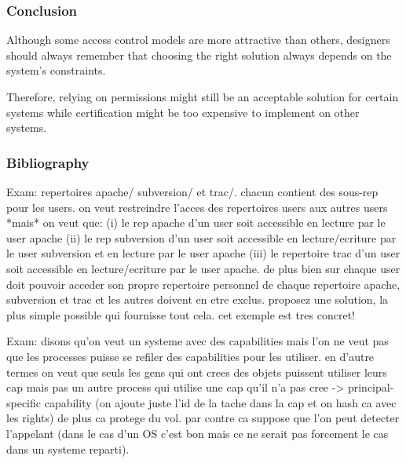 
\begin{frame}
  \frametitle{Conclusion}

  Although some access control models are more attractive than others,
  designers should always remember that choosing the right solution always
  depends on the system's constraints.

  \-

  Therefore, relying on  permissions might still be an acceptable
  solution for certain systems while certification might be too expensive
  to implement on other systems.
\end{frame}

%
%

\begin{frame}
  \frametitle{Bibliography}

  
  
\end{frame}



Exam: repertoires apache/ subversion/ et trac/. chacun contient des sous-rep
  pour les users. on veut restreindre l'acces des repertoires users aux autres
  users *mais* on veut que: (i) le rep apache d'un user soit accessible
  en lecture par le user apache (ii) le rep subversion d'un user soit
  accessible en lecture/ecriture par le user subversion et en lecture par
  le user apache (iii) le repertoire trac d'un user soit accessible en
  lecture/ecriture par le user apache.
  de plus bien sur chaque user doit pouvoir acceder son propre repertoire
  personnel de chaque repertoire apache, subversion et trac et les autres
  doivent en etre exclus.
  proposez une solution, la plus simple possible qui fournisse tout cela.
  cet exemple est tres concret!

Exam: disons qu'on veut un systeme avec des capabilities mais l'on ne veut
  pas que les processes puisse se refiler des capabilities pour les utiliser.
  en d'autre termes on veut que seuls les gens qui ont crees des objets
  puissent utiliser leurs cap mais pas un autre process qui utilise une cap
  qu'il n'a pas cree -> principal-specific capability (on ajoute juste l'id
  de la tache dans la cap et on hash ca avec les rights)
  de plus ca protege du vol. par contre ca suppose que l'on peut detecter
  l'appelant (dans le cas d'un OS c'est bon mais ce ne serait pas forcement
  le cas dans un systeme reparti).
